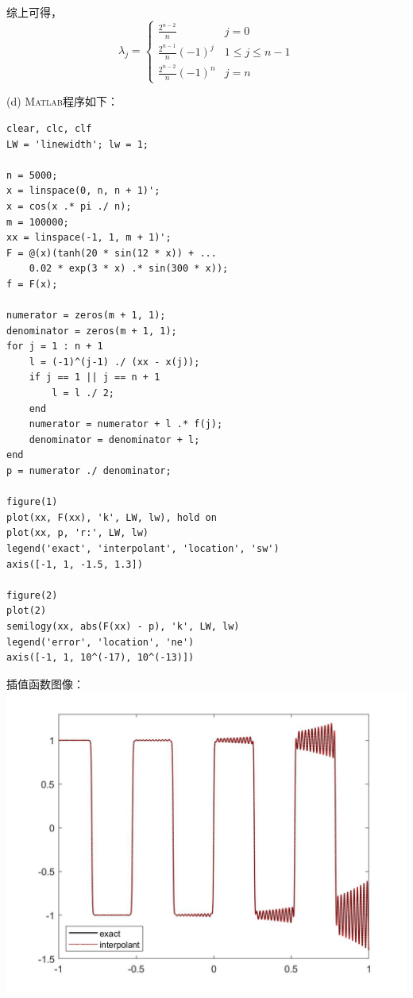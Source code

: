 \documentclass[12pt,a4paper,utf8]{ctexart}
\begin{document}
\begin{enumerate}
综上可得，
\begin{equation}
   \lambda_j = \left\{
   \begin{array}{lc}
      \frac{2^{n-2}}{n} & j = 0\\
      \frac{2^{n-1}}{n} (-1)^j & 1 \le j \le n-1\\
      \frac{2^{n-2}}{n}(-1)^n & j = n
   \end{array}
   \right.
\end{equation}



\subitem(d)
\textsc{Matlab}程序如下：
\begin{lstlisting}[frame=single]
clear, clc, clf
LW = 'linewidth'; lw = 1;

n = 5000;
x = linspace(0, n, n + 1)';
x = cos(x .* pi ./ n);
m = 100000;
xx = linspace(-1, 1, m + 1)';
F = @(x)(tanh(20 * sin(12 * x)) + ...
    0.02 * exp(3 * x) .* sin(300 * x));
f = F(x);

numerator = zeros(m + 1, 1);
denominator = zeros(m + 1, 1);
for j = 1 : n + 1
    l = (-1)^(j-1) ./ (xx - x(j));
    if j == 1 || j == n + 1
        l = l ./ 2;
    end
    numerator = numerator + l .* f(j);
    denominator = denominator + l;
end
p = numerator ./ denominator;

figure(1)
plot(xx, F(xx), 'k', LW, lw), hold on
plot(xx, p, 'r:', LW, lw)
legend('exact', 'interpolant', 'location', 'sw')
axis([-1, 1, -1.5, 1.3])

figure(2)
plot(2)
semilogy(xx, abs(F(xx) - p), 'k', LW, lw)
legend('error', 'location', 'ne')
axis([-1, 1, 10^(-17), 10^(-13)])
\end{lstlisting}

插值函数图像：\\
\includegraphics[width = .8\textwidth]{1.d.interpolant.jpg}


\end{enumerate}
\end{document}

